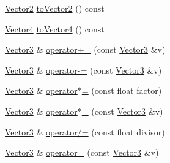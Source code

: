 \begin{DoxyCompactItemize}
\item 
\hyperlink{classprism_1_1_vector2}{Vector2} \hyperlink{classprism_1_1_vector3_adc9274bb1950e14acadcff0346732d2e}{to\+Vector2} () const 
\item 
\hyperlink{classprism_1_1_vector4}{Vector4} \hyperlink{classprism_1_1_vector3_a28ec8653ad976a191c08d6607fbb7138}{to\+Vector4} () const 
\item 
\hyperlink{classprism_1_1_vector3}{Vector3} \& \hyperlink{classprism_1_1_vector3_a01c359c54b0abcb52476485519a1c225}{operator+=} (const \hyperlink{classprism_1_1_vector3}{Vector3} \&v)
\item 
\hyperlink{classprism_1_1_vector3}{Vector3} \& \hyperlink{classprism_1_1_vector3_a65a52141177ffdc50d2169c912c4138c}{operator-\/=} (const \hyperlink{classprism_1_1_vector3}{Vector3} \&v)
\item 
\hyperlink{classprism_1_1_vector3}{Vector3} \& \hyperlink{classprism_1_1_vector3_ab1390ad98107197f561ce857b9125ff5}{operator$\ast$=} (const float factor)
\item 
\hyperlink{classprism_1_1_vector3}{Vector3} \& \hyperlink{classprism_1_1_vector3_ae9da88eded53b926f72e7eeefcf12407}{operator$\ast$=} (const \hyperlink{classprism_1_1_vector3}{Vector3} \&v)
\item 
\hyperlink{classprism_1_1_vector3}{Vector3} \& \hyperlink{classprism_1_1_vector3_a1b79c5f89ef21b3e2e291143bdd63da0}{operator/=} (const float divisor)
\item 
\hyperlink{classprism_1_1_vector3}{Vector3} \& \hyperlink{classprism_1_1_vector3_a420aed8bb44a4fe75784ce6e5d3d6d32}{operator=} (const \hyperlink{classprism_1_1_vector3}{Vector3} \&v)
\end{DoxyCompactItemize}
